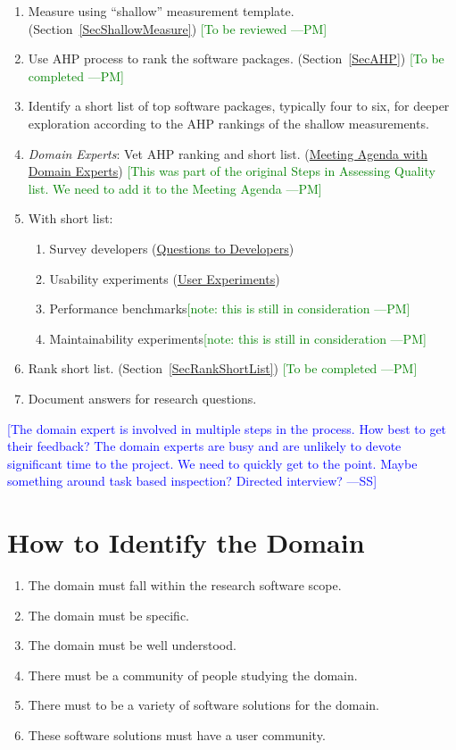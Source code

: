 \documentclass[letterpaper,cleveref]{lipics-v2019}
\newcommand{\authornote}[3]{\textcolor{#1}{[#3 ---#2]}}
\newcommand{\authornote}[3]{}
\newcommand{\wss}[1]{\authornote{blue}{SS}{#1}} %
\newcommand{\pmi}[1]{\authornote{green}{PM}{#1}} %
\theoremstyle{definition}
\begin{document}
\begin{enumerate}
\item Measure using ``shallow'' measurement template. (Section~\ref{SecShallowMeasure}) \pmi{To be reviewed}
\item Use AHP process to rank the software packages. (Section~\ref{SecAHP}) \pmi{To be completed}
\item Identify a short list of top software packages, typically four to six, for deeper exploration according to the AHP rankings of the shallow measurements.
\item \emph{Domain Experts}: Vet AHP ranking and short list. (\href{run:Meeting Agenda with Domain Experts.pdf}{Meeting Agenda with Domain Experts}) \pmi{This was part of the original Steps in Assessing Quality list. We need to add it to the Meeting Agenda}
\item With short list:
\begin{enumerate}
\item Survey developers (\href{run:Questions to Developers.pdf}{Questions to Developers})
\item Usability experiments (\href{run:User Experiments.pdf}{User Experiments})
\item Performance benchmarks\pmi{note: this is still in consideration}
\item Maintainability experiments\pmi{note: this is still in consideration}
\end{enumerate}
\item Rank short list. (Section~\ref{SecRankShortList}) \pmi{To be completed}
\item Document answers for research questions.
\end{enumerate}

\wss{The domain expert is involved in multiple steps in the process.  How best
  to get their feedback?  The domain experts are busy and are unlikely to devote
  significant time to the project.  We need to quickly get to the point.  Maybe
  something around task based inspection?  Directed interview?}


\section{How to Identify the Domain} \label{SecIdentifyDomain}
\begin{enumerate}	
	\item The domain must fall within the research software scope.
	\item The domain must be specific.
	\item The domain must be well understood.
	\item There must be a community of people studying the domain.
	\item There must to be a variety of software solutions for the domain.
	\item These software solutions must have a user community.
\end{enumerate}
\end{document}

